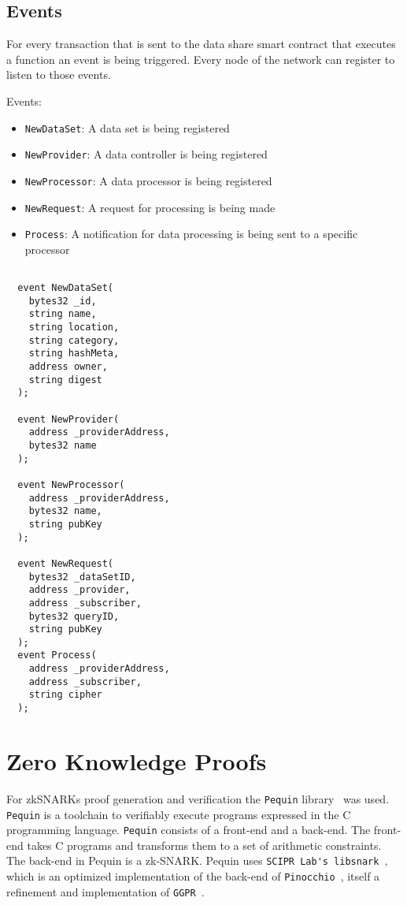 \subsection{Events}
\label{implemenation:contracts:events}

For every transaction that is sent to the data share smart contract that executes a function an event is being triggered. Every node of the network can register to listen to those events.

Events:

\begin{itemize}
  \item \verb|NewDataSet|: A data set is being registered
  \item \verb|NewProvider|: A data controller is being registered
  \item \verb|NewProcessor|: A data processor is being registered
  \item \verb|NewRequest|: A request for processing is being made
  \item \verb|Process|: A notification for data processing is being sent to a specific processor
\end{itemize}

\begin{lstlisting}[language=Solidity, caption={Data sharing application events}]

  event NewDataSet(
    bytes32 _id,
    string name,
    string location,
    string category,
    string hashMeta,
    address owner,
    string digest
  );

  event NewProvider(
    address _providerAddress,
    bytes32 name
  );

  event NewProcessor(
    address _providerAddress,
    bytes32 name,
    string pubKey
  );

  event NewRequest(
    bytes32 _dataSetID,
    address _provider,
    address _subscriber,
    bytes32 queryID,
    string pubKey
  );
  event Process(
    address _providerAddress,
    address _subscriber,
    string cipher
  );
\end{lstlisting}

\section{Zero Knowledge Proofs}
\label{implemenation:zkp}

For zkSNARKs proof generation and verification the \verb|Pequin| library~\cite{pequin} was used. \verb|Pequin| is a toolchain to verifiably execute programs expressed in the C programming language. \verb|Pequin| consists of a front-end and a back-end. The front-end takes C programs and transforms them to a set of arithmetic constraints. The back-end in Pequin is a zk-SNARK. Pequin uses \verb|SCIPR Lab's libsnark|~\cite{libsnark}, which is an optimized implementation of the back-end of \verb|Pinocchio|~\cite{pinocchio-nearly-practical-verifiable-computation}, itself a refinement and implementation of \verb|GGPR|~\cite{ggpr}.

